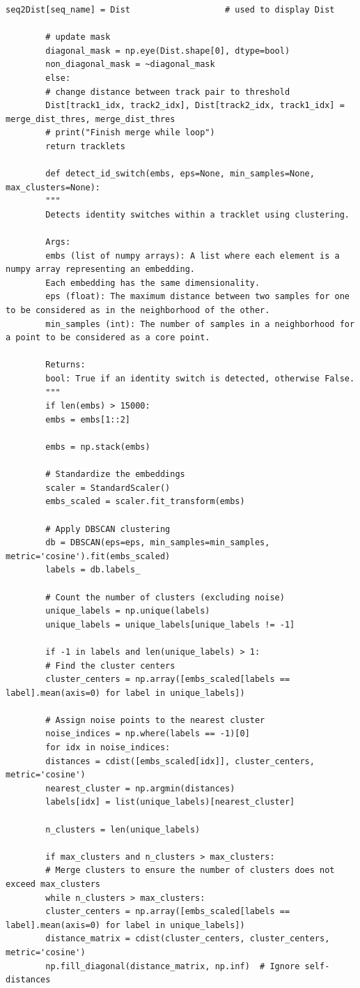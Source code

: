 \documentclass[12pt, a4paper, twoside]{article}
\begin{document}
\begin{lstlisting}[style=pythonstyle]
		seq2Dist[seq_name] = Dist                   # used to display Dist
		
		# update mask
		diagonal_mask = np.eye(Dist.shape[0], dtype=bool)
		non_diagonal_mask = ~diagonal_mask
		else:
		# change distance between track pair to threshold
		Dist[track1_idx, track2_idx], Dist[track2_idx, track1_idx] = merge_dist_thres, merge_dist_thres
		# print("Finish merge while loop")
		return tracklets
		
		def detect_id_switch(embs, eps=None, min_samples=None, max_clusters=None):
		"""
		Detects identity switches within a tracklet using clustering.
		
		Args:
		embs (list of numpy arrays): A list where each element is a numpy array representing an embedding.
		Each embedding has the same dimensionality.
		eps (float): The maximum distance between two samples for one to be considered as in the neighborhood of the other.
		min_samples (int): The number of samples in a neighborhood for a point to be considered as a core point.
		
		Returns:
		bool: True if an identity switch is detected, otherwise False.
		"""
		if len(embs) > 15000:
		embs = embs[1::2]
		
		embs = np.stack(embs)
		
		# Standardize the embeddings
		scaler = StandardScaler()
		embs_scaled = scaler.fit_transform(embs)
		
		# Apply DBSCAN clustering
		db = DBSCAN(eps=eps, min_samples=min_samples, metric='cosine').fit(embs_scaled)
		labels = db.labels_
		
		# Count the number of clusters (excluding noise)
		unique_labels = np.unique(labels)
		unique_labels = unique_labels[unique_labels != -1]
		
		if -1 in labels and len(unique_labels) > 1:
		# Find the cluster centers
		cluster_centers = np.array([embs_scaled[labels == label].mean(axis=0) for label in unique_labels])
		
		# Assign noise points to the nearest cluster
		noise_indices = np.where(labels == -1)[0]
		for idx in noise_indices:
		distances = cdist([embs_scaled[idx]], cluster_centers, metric='cosine')
		nearest_cluster = np.argmin(distances)
		labels[idx] = list(unique_labels)[nearest_cluster]
		
		n_clusters = len(unique_labels)
		
		if max_clusters and n_clusters > max_clusters:
		# Merge clusters to ensure the number of clusters does not exceed max_clusters
		while n_clusters > max_clusters:
		cluster_centers = np.array([embs_scaled[labels == label].mean(axis=0) for label in unique_labels])
		distance_matrix = cdist(cluster_centers, cluster_centers, metric='cosine')
		np.fill_diagonal(distance_matrix, np.inf)  # Ignore self-distances
		

\end{lstlisting}
\end{document}
